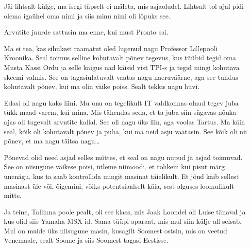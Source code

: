                  

Jäi lihtsalt külge, ma isegi täpselt ei mäleta, mis asjaoludel. Lihtsalt tol 
ajal pidi olema igaühel oma nimi ja siis minu nimi oli lõpuks see.


Arvutite juurde sattusin ma enne, kui must Pronto sai.

Ma ei tea, kas sihukest raamatut oled lugenud nagu Professor Lillepooli 
Kroonika. 
Seal toimus selline kohutavalt põnev tegevus, kus tüübid tegid oma Musta Kassi 
Ordu ja selle käigus nad käisid vist TPI-s ja tegid mingi kohutava skeemi 
valmis. See on  tagasiulatuvalt vaatas nagu naeruväärne, aga see tundus 
kohutavalt  põnev, kui ma  olin väike poiss. Sealt tekkis nagu huvi. 

Edasi oli nagu kaks liini. Mu onu on tegelikult IT valdkonnas olnud tegev juba 
tükk maad varem, kui mina. Mis tähendas seda, et ta juba siin sügavas 
nõuka-ajas oli tugevalt arvutite kallal. See oli nagu üks liin, aga voolas 
Tartus. Ma käin seal, kõik oli kohutavalt põnev ja puha, kui ma neid asju 
vaatasin. See kõik oli nii põnev, et ma nagu täitsa nagu\ldots


Põnevad olid need asjad selles mõttes, et seal on nagu nupud ja asjad toimuvad. 
See on niisugune väikese poisi, ütleme niimoodi, et rohkem kui pisut märg 
unenägu, kus ta saab kontrollida mingit masinat täielikult. Et jõud käib 
sellest masinast üle või, õigemini, võiks potentsiaalselt käia, sest alguses 
loomulikult mitte. 

Ja teine, Tallinna poole pealt, oli see klass, mis Jaak 
Loondel oli Luise tänaval ja kus olid siis Yamaha 
MSX-id. Sama tüüpi aparaat, mis mul siin külje all 
seisab. Mul on muide üks niisugune masin, kusagilt Soomest ostsin, mis on 
veetud Venemaale, sealt Soome ja siis Soomest tagasi Eestisse.

